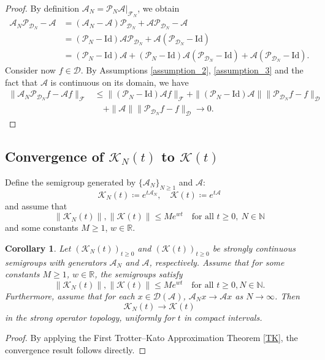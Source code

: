 \documentclass{article}[11]
\newtheorem{corollary}[theorem]{Corollary}
\begin{document}
	\begin{proof}
		By definition $\mathcal{A}_N = \mathcal{P}_N \mathcal{A} |_{\mathcal{F}_N}$, we obtain
		\begin{align*}
			\mathcal{A}_N \mathcal{P}_{\mathcal{D}_N} - \mathcal{A} &= (\mathcal{A}_N - \mathcal{A}) \mathcal{P}_{\mathcal{D}_N} + \mathcal{A} \mathcal{P}_{\mathcal{D}_N} - \mathcal{A} \\
			&= (\mathcal{P}_N - \mathrm{Id}) \mathcal{A} \mathcal{P}_{\mathcal{D}_N} + \mathcal{A} (\mathcal{P}_{\mathcal{D}_N} - \mathrm{Id}) \\
			&= (\mathcal{P}_N - \mathrm{Id}) \mathcal{A} + (\mathcal{P}_N - \mathrm{Id}) \mathcal{A} (\mathcal{P}_{\mathcal{D}_N} - \mathrm{Id}) + \mathcal{A} (\mathcal{P}_{\mathcal{D}_N} - \mathrm{Id}).
		\end{align*}	
		Consider now $f \in \mathcal{D}$. By Assumptions \ref{assumption_2}, \ref{assumption_3} and the fact that $\mathcal{A}$ is continuous on its domain, we have
		\begin{align*}
			\| \mathcal{A}_N \mathcal{P}_{\mathcal{D}_N} f - \mathcal{A} f \|_{\mathcal{F}} &\leq \| (\mathcal{P}_N - \mathrm{Id}) \mathcal{A} f \|_{\mathcal{F}} + \| (\mathcal{P}_N - \mathrm{Id}) \mathcal{A} \| \| \mathcal{P}_{\mathcal{D}_N} f - f \|_{\mathcal{D}} \\
			&\quad + \| \mathcal{A} \| \| \mathcal{P}_{\mathcal{D}_N} f - f \|_{\mathcal{D}} \to 0.
		\end{align*}	
	\end{proof}
	
	
	
	
	\subsection{Convergence of \(\mathcal{K}_N(t)\) to \(\mathcal{K}(t)\)}
	
	Define the semigroup generated by $\{\mathcal{A}_N\}_{N \geq 1}$ and $\mathcal{A}$:
	$$
	\mathcal{K}_N(t) \coloneqq e^{t\mathcal{A}_N}, \quad \mathcal{K}(t) \coloneqq e^{t\mathcal{A}}
	$$
	and assume that 
	$$
	\|\mathcal{K}_N(t)\|, \|\mathcal{K}(t)\| \leq Me^{wt} \quad \textrm{for all } t\geq0, \  N\in\mathbb{N}
	$$
	and some constants $M \geq 1$, $w \in \mathbb{R}$.
	
	\begin{corollary}
		Let $(\mathcal{K}_N(t))_{t\geq0}$ and $(\mathcal{K}(t))_{t\geq0}$ be strongly continuous semigroups with generators $\mathcal{A}_N$ and $\mathcal{A}$, respectively. Assume that for some constants $M \geq 1$, $w \in \mathbb{R}$, the semigroups satisfy
		\[
		\|\mathcal{K}_N(t)\|, \|\mathcal{K}(t)\| \leq Me^{wt} \quad \text{for all } t \geq 0, N \in \mathbb{N}.
		\]
		Furthermore, assume that for each $x \in \mathcal{D}(\mathcal{A})$, $\mathcal{A}_N x \to \mathcal{A} x$ as $N \to \infty$. Then 
		$$
		\mathcal{K}_N(t) \to \mathcal{K}(t)
		$$
		in the strong operator topology, uniformly for $t$ in compact intervals.
	\end{corollary}
	\begin{proof}
		By applying the First Trotter--Kato Approximation Theorem \ref{TK}, the convergence result follows directly.
	\end{proof}
	
\end{document}
